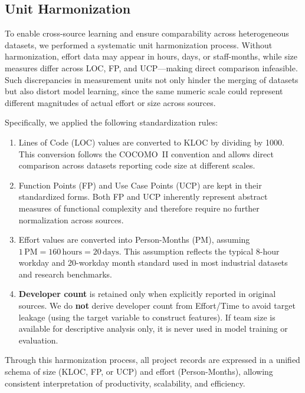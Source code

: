 \documentclass{ieeeaccess}
\begin{document}
\graphicspath{{figures/}} %

\subsection{Unit Harmonization}
To enable cross-source learning and ensure comparability across heterogeneous datasets, 
we performed a systematic unit harmonization process. 
Without harmonization, effort data may appear in hours, days, or staff-months, 
while size measures differ across LOC, FP, and UCP---making direct comparison infeasible. 
Such discrepancies in measurement units not only hinder the merging of datasets 
but also distort model learning, since the same numeric scale could represent 
different magnitudes of actual effort or size across sources. 

Specifically, we applied the following standardization rules:
\begin{enumerate}[label=(\roman*), leftmargin=2em]
    \item Lines of Code (LOC) values are converted to KLOC by dividing by 1000. 
    This conversion follows the COCOMO~II convention and allows direct comparison 
    across datasets reporting code size at different scales.

    \item Function Points (FP) and Use Case Points (UCP) are kept in their standardized forms. 
    Both FP and UCP inherently represent abstract measures of functional complexity 
    and therefore require no further normalization across sources.

    \item Effort values are converted into Person-Months (PM), assuming 
    $1\,\text{PM} = 160\,\text{hours} = 20\,\text{days}$. 
    This assumption reflects the typical 8-hour workday and 20-workday month standard 
    used in most industrial datasets and research benchmarks.

    \item \textbf{Developer count} is retained only when explicitly reported in original sources. 
    We do \textbf{not} derive developer count from Effort/Time to avoid target leakage 
    (using the target variable to construct features). 
    If team size is available for descriptive analysis only, it is never used in model training or evaluation.
\end{enumerate}

Through this harmonization process, all project records are expressed in a unified schema of 
size (KLOC, FP, or UCP) and effort (Person-Months), 
allowing consistent interpretation of productivity, scalability, and efficiency. 
\end{document}
